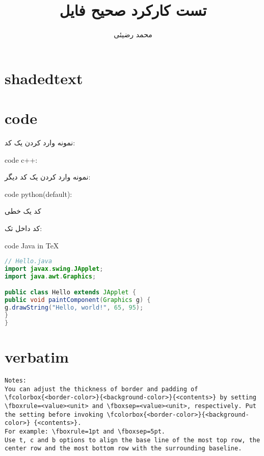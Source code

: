 \documentclass[12pt]{article}
\title{تست کارکرد صحیح فایل}
\author{محمد رضیئی}
\begin{document}
{}
\maketitle

\section{shadedtext}
\ptext[1]
\begin{shadedtext}
	\ptext[1-10]
\end{shadedtext}
\ptext[1]
\section{code}
	نمونه وارد کردن یک کد:

\begin{latin}
\noindent code c++:

\end{latin}	

\newlines



نمونه وارد کردن یک کد دیگر:

	
\begin{latin}
\noindent code python(default):

\end{latin}
کد یک خطی

کد داخل تک:
\begin{latin}
\noindent code Java in \TeX
\begin{lstlisting}[language = Java]
// Hello.java
import javax.swing.JApplet;
import java.awt.Graphics;

public class Hello extends JApplet {
public void paintComponent(Graphics g) {
g.drawString("Hello, world!", 65, 95);
}    
}
\end{lstlisting}
\end{latin}
\currentpagecolor

\section{verbatim} %

\begin{latin}	
\begin{Verbatim}[breaklines=true, breakanywhere=true]
Notes:
You can adjust the thickness of border and padding of
\fcolorbox{<border-color>}{<background-color>}{<contents>} by setting \fboxrule=<value><unit> and \fboxsep=<value><unit>, respectively. Put the setting before invoking \fcolorbox{<border-color>}{<background-color>} {<contents>}. 
For example: \fboxrule=1pt and \fboxsep=5pt.
Use t, c and b options to align the base line of the most top row, the center row and the most bottom row with the surrounding baseline.
\end{Verbatim}
\end{latin}
\end{document}
